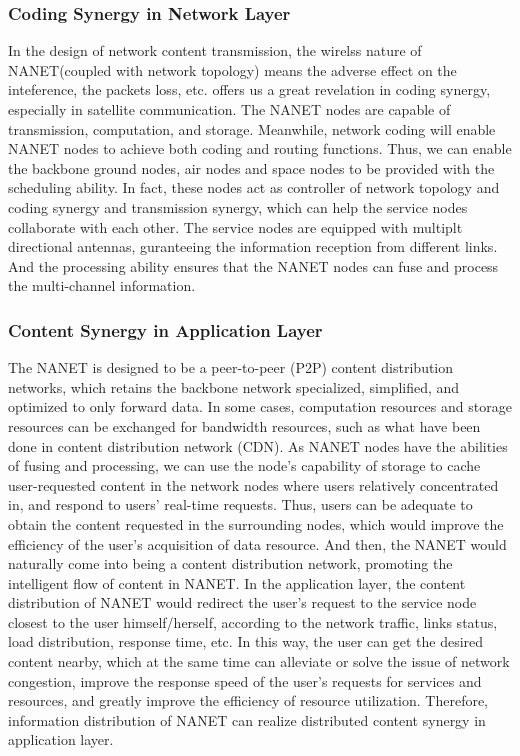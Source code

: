 \documentclass[journal,comsoc]{IEEEtran}
\begin{document}
			\subsubsection{Coding Synergy in Network Layer}
				In the design of network content transmission, the wirelss nature of NANET(coupled with network topology) means the adverse effect on the inteference, the packets loss, etc.
				\cite{ahlswede2000network} offers us a great revelation in coding synergy, especially in satellite communication. 
				The NANET nodes are capable of transmission, computation, and storage.
				Meanwhile, network coding will enable NANET nodes to achieve both coding and routing functions.
				Thus, we can enable the backbone ground nodes, air nodes and space nodes to be provided with the scheduling ability.
				In fact, these nodes act as controller of network topology and coding synergy and transmission synergy, which can help the service nodes collaborate with each other.
				The service nodes are equipped with multiplt directional antennas, guranteeing the information reception from different links.
				And the processing ability ensures that the NANET nodes can fuse and process the multi-channel information.

			\subsubsection{Content Synergy in Application Layer}
				The NANET is designed to be a peer-to-peer (P2P) content distribution networks, which retains the backbone network specialized, simplified, and optimized to only forward data.
				In some cases, computation resources and storage resources can be exchanged for bandwidth resources, such as what have been done in content distribution network (CDN)\cite{gkantsidis2005network}\cite{peng2004cdn}. 
				As NANET nodes have the abilities of fusing and processing, we can use the node's capability of storage to cache user-requested content in the network nodes where users relatively concentrated in, and respond to users' real-time requests. 
				Thus, users can be adequate to obtain the content requested in the surrounding nodes, which would improve the efficiency of the user's acquisition of data resource.
				And then, the NANET would naturally come into being a content distribution network, promoting the intelligent flow of content in NANET.
				In the application layer, the content distribution of NANET would redirect the user's request to the service node closest to the user himself/herself, according to the network traffic, links status, load distribution, response time, etc.
				In this way, the user can get the desired content nearby, which at the same time can alleviate or solve the issue of network congestion, improve the response speed of the user's requests for services and resources, and greatly improve the efficiency of resource utilization.
				Therefore, information distribution of NANET can realize distributed content synergy in application layer.
				
\end{document}
